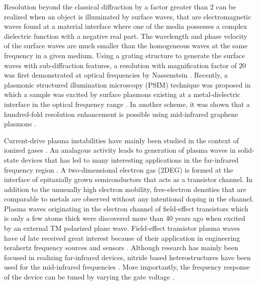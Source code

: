 \documentclass[11pt]{article}
\begin{document}
Resolution beyond the classical diffraction by a factor greater than $2$ can be realized when an object is illuminated by surface waves, that are electromagnetic waves found at a material interface where one of the media possesses a complex dielectric function with a negative real part. The wavelength and phase velocity of the surface waves are much smaller than the homogeneous waves at the same frequency in a given medium. Using a grating structure to generate the surface waves with sub-diffraction features, a resolution with magnification factor of $20$ was first demonstrated at optical frequencies by Nassenstein \cite{Nassenstein1970}. Recently, a plasmonic structured illumination microscopy (PSIM) technique was proposed in which a sample was excited by surface plasmons existing at a metal-dielectric interface in the optical frequency range \cite{Wei2010}. In another scheme, it was shown that a hundred-fold resolution enhancement is possible using mid-infrared
graphene plasmons \cite{Zeng2014}.

Current-drive plasma instabilities have mainly been studied in the context of ionized gases \cite{9781489947871}.  An analagous activity leads to generation  of plasma waves in solid-state devices \cite{Kempa1991} that has led to many interesting applications in the far-infrared frequency region \cite{Dyer_2016, Wu2015}. A two-dimensional electron gas (2DEG) is formed at the interface of epitaxially grown semiconductors that acts as a transistor channel. In addition to the unusually high electron mobility, free-electron densities that are comparable to metals are observed without any intentional doping in the channel. Plasma waves originating in the electron channel of field-effect transistors which is only a few atoms thick were discovered more than 40 years ago \cite{Stern1967a, Allen1977} when excited by an external TM polarized plane wave. Field-effect transistor plasma waves have of late received great interest because of their application in engineering terahertz frequency sources and
sensors \cite{Dyakonov1993, Dyakonov1996, Popov2005, Otsuji2006, Dyakonov2005}. Although research has mainly been focused in realizing far-infrared devices, nitride based heterostructures have been used for the mid-infrared frequencies
\cite{Hofstetter2002}. More importantly, the frequency response of the device can be tuned by varying the gate voltage \cite{Fatimy2010, Rabbaa2011}.
\end{document}
